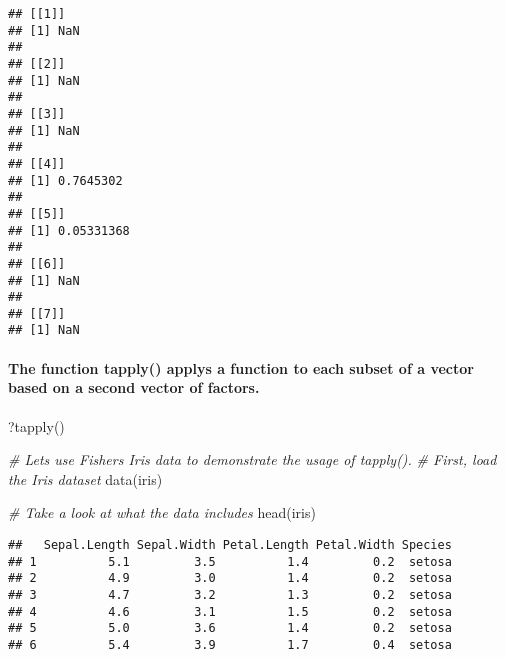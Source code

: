 \documentclass[
]{article}
\newenvironment{Shaded}{\begin{snugshade}}{\end{snugshade}}
\newcommand{\CommentTok}[1]{\textcolor[rgb]{0.56,0.35,0.01}{\textit{#1}}}
\newcommand{\FunctionTok}[1]{\textcolor[rgb]{0.00,0.00,0.00}{#1}}
\newcommand{\NormalTok}[1]{#1}
\newcommand{\SpecialCharTok}[1]{\textcolor[rgb]{0.00,0.00,0.00}{#1}}
\begin{document}
\begin{verbatim}
## [[1]]
## [1] NaN
## 
## [[2]]
## [1] NaN
## 
## [[3]]
## [1] NaN
## 
## [[4]]
## [1] 0.7645302
## 
## [[5]]
## [1] 0.05331368
## 
## [[6]]
## [1] NaN
## 
## [[7]]
## [1] NaN
\end{verbatim}

\hypertarget{the-function-tapply-applys-a-function-to-each-subset-of-a-vector-based-on-a-second-vector-of-factors.}{%
\paragraph{The function tapply() applys a function to each subset of a
vector based on a second vector of
factors.}\label{the-function-tapply-applys-a-function-to-each-subset-of-a-vector-based-on-a-second-vector-of-factors.}}

\begin{Shaded}
\begin{Highlighting}[]
\NormalTok{?}\FunctionTok{tapply}\NormalTok{()}

\CommentTok{\# Let\textquotesingle{}s use Fisher\textquotesingle{}s Iris data to demonstrate the usage of tapply().}
\CommentTok{\# First, load the Iris dataset}
\FunctionTok{data}\NormalTok{(iris)}

\CommentTok{\# Take a look at what the data includes}
\FunctionTok{head}\NormalTok{(iris)}
\end{Highlighting}
\end{Shaded}

\begin{verbatim}
##   Sepal.Length Sepal.Width Petal.Length Petal.Width Species
## 1          5.1         3.5          1.4         0.2  setosa
## 2          4.9         3.0          1.4         0.2  setosa
## 3          4.7         3.2          1.3         0.2  setosa
## 4          4.6         3.1          1.5         0.2  setosa
## 5          5.0         3.6          1.4         0.2  setosa
## 6          5.4         3.9          1.7         0.4  setosa
\end{verbatim}

\begin{Shaded}
\end{Shaded}
\end{document}
